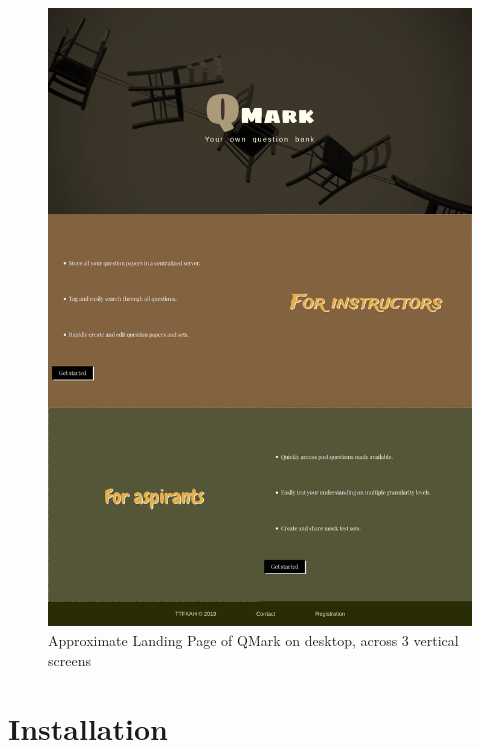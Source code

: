 \documentclass[13pt]{article}
\begin{document}
\newpage
\begin{figure}[H]
    \includegraphics[width=\textwidth,height=\textheight,keepaspectratio]{home.png}
    
    \caption{Approximate Landing Page of QMark on desktop, across 3 vertical screens}
    \label{fig:home}
\end{figure}
\section{Installation}
\end{document}
